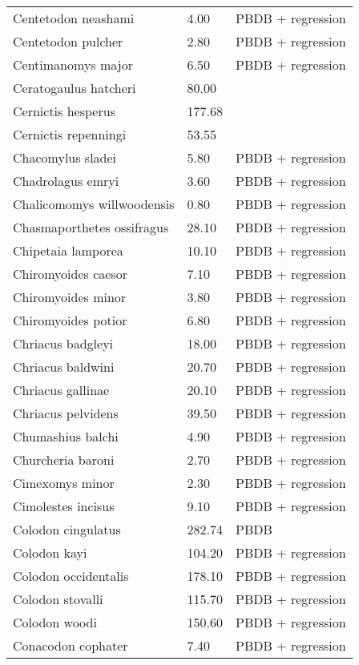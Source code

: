 \documentclass{article}
\begin{document}
\begin{center}
\begin{longtable}{p{} p{} p{}}
    Centetodon neashami & 4.00 & PBDB + regression \\ 
    Centetodon pulcher & 2.80 & PBDB + regression \\ 
    Centimanomys major & 6.50 & PBDB + regression \\ 
    Ceratogaulus hatcheri & 80.00 & \cite{Cassiliano2008} \\ 
    Cernictis hesperus & 177.68 & \cite{Tomiya2013} \\ 
    Cernictis repenningi & 53.55 & \cite{Hall1930} \\ 
    Chacomylus sladei & 5.80 & PBDB + regression \\ 
    Chadrolagus emryi & 3.60 & PBDB + regression \\ 
    Chalicomomys willwoodensis & 0.80 & PBDB + regression \\ 
    Chasmaporthetes ossifragus & 28.10 & PBDB + regression \\ 
    Chipetaia lamporea & 10.10 & PBDB + regression \\ 
    Chiromyoides caesor & 7.10 & PBDB + regression \\ 
    Chiromyoides minor & 3.80 & PBDB + regression \\ 
    Chiromyoides potior & 6.80 & PBDB + regression \\ 
    Chriacus badgleyi & 18.00 & PBDB + regression \\ 
    Chriacus baldwini & 20.70 & PBDB + regression \\ 
    Chriacus gallinae & 20.10 & PBDB + regression \\ 
    Chriacus pelvidens & 39.50 & PBDB + regression \\ 
    Chumashius balchi & 4.90 & PBDB + regression \\ 
    Churcheria baroni & 2.70 & PBDB + regression \\ 
    Cimexomys minor & 2.30 & PBDB + regression \\ 
    Cimolestes incisus & 9.10 & PBDB + regression \\ 
    Colodon cingulatus & 282.74 & PBDB \\ 
    Colodon kayi & 104.20 & PBDB + regression \\ 
    Colodon occidentalis & 178.10 & PBDB + regression \\ 
    Colodon stovalli & 115.70 & PBDB + regression \\ 
    Colodon woodi & 150.60 & PBDB + regression \\ 
    Conacodon cophater & 7.40 & PBDB + regression \\ 

\end{longtable}
\end{center}
\end{document}

